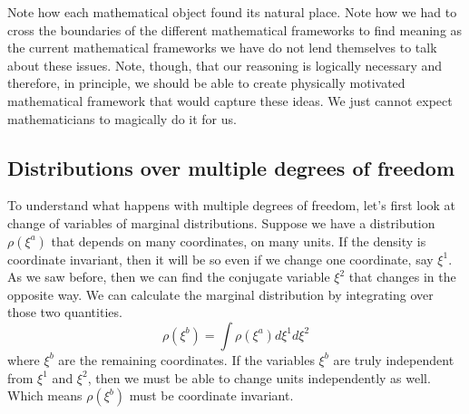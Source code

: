 \documentclass[11pt]{article}
\begin{document}
Note how each mathematical object found its natural place. Note how we had to cross the boundaries of the different mathematical frameworks to find meaning as the current mathematical frameworks we have do not lend themselves to talk about these issues. Note, though, that our reasoning is logically necessary and therefore, in principle, we should be able to create physically motivated mathematical framework that would capture these ideas. We just cannot expect mathematicians to magically do it for us.

\subsection*{Distributions over multiple degrees of freedom}

To understand what happens with multiple degrees of freedom, let's first look at change of variables of marginal distributions. Suppose we have a distribution $\rho(\xi^a)$ that depends on many coordinates, on many units. If the density is coordinate invariant, then it will be so even if we change one coordinate, say $\xi^1$. As we saw before, then we can find the conjugate variable $\xi^2$ that changes in the opposite way. We can calculate the marginal distribution by integrating over those two quantities.
\begin{equation}
\rho(\xi^b) = \int \rho(\xi^a) d\xi^1 d\xi^2
\end{equation}
where $\xi^b$ are the remaining coordinates. If the variables $\xi^b$ are truly independent from $\xi^1$ and $\xi^2$, then we must be able to change units independently as well. Which means $\rho(\xi^b)$ must be coordinate invariant.
\end{document}
